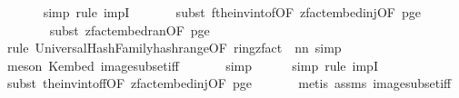 \begin{isabellebody}
\ \ \ \ \ \isamarkupfalse%
\ {\isacharparenleft}{\kern0pt}simp{\isacharcomma}{\kern0pt}\ rule\ impI{\isacharparenright}{\kern0pt}\isanewline
\ \ \ \ \ \isamarkupfalse%
\ {\isacharparenleft}{\kern0pt}subst\ f{\isacharunderscore}{\kern0pt}the{\isacharunderscore}{\kern0pt}inv{\isacharunderscore}{\kern0pt}into{\isacharunderscore}{\kern0pt}f{\isacharbrackleft}{\kern0pt}OF\ zfact{\isacharunderscore}{\kern0pt}embed{\isacharunderscore}{\kern0pt}inj{\isacharbrackleft}{\kern0pt}OF\ p{\isacharunderscore}{\kern0pt}ge{\isacharunderscore}{\kern0pt}{}{\isacharbrackright}{\kern0pt}{\isacharbrackright}{\kern0pt}{\isacharparenright}{\kern0pt}\isanewline
\ \ \ \ \ \ \isamarkupfalse%
\ {\isacharparenleft}{\kern0pt}subst\ zfact{\isacharunderscore}{\kern0pt}embed{\isacharunderscore}{\kern0pt}ran{\isacharbrackleft}{\kern0pt}OF\ p{\isacharunderscore}{\kern0pt}ge{\isacharunderscore}{\kern0pt}{}{\isacharbrackright}{\kern0pt}{\isacharparenright}{\kern0pt}\isanewline
\ \ \ \ \ \ \isamarkupfalse%
\ {\isacharparenleft}{\kern0pt}rule\ UniversalHashFamily{\isachardot}{\kern0pt}hash{\isacharunderscore}{\kern0pt}range{\isacharbrackleft}{\kern0pt}OF\ ring{\isacharunderscore}{\kern0pt}zfact{\isacharcomma}{\kern0pt}\ \ n{\isacharequal}{\kern0pt}{\isachardoublequoteopen}n{\isachardoublequoteclose}{\isacharbrackright}{\kern0pt}{\isacharcomma}{\kern0pt}\ simp{\isacharparenright}{\kern0pt}\isanewline
\ \ \ \ \ \ \isamarkupfalse%
\ {\isacharparenleft}{\kern0pt}meson\ K{\isacharunderscore}{\kern0pt}embed\ image{\isacharunderscore}{\kern0pt}subset{\isacharunderscore}{\kern0pt}iff{\isacharparenright}{\kern0pt}\isanewline
\ \ \ \ \ \isamarkupfalse%
\ simp\isanewline
\ \ \ \ \isamarkupfalse%
\ {\isacharparenleft}{\kern0pt}simp{\isacharcomma}{\kern0pt}\ rule\ impI{\isacharparenright}{\kern0pt}\isanewline
\ \ \ \ \isamarkupfalse%
\ {\isacharparenleft}{\kern0pt}subst\ the{\isacharunderscore}{\kern0pt}inv{\isacharunderscore}{\kern0pt}into{\isacharunderscore}{\kern0pt}f{\isacharunderscore}{\kern0pt}f{\isacharbrackleft}{\kern0pt}OF\ zfact{\isacharunderscore}{\kern0pt}embed{\isacharunderscore}{\kern0pt}inj{\isacharbrackleft}{\kern0pt}OF\ p{\isacharunderscore}{\kern0pt}ge{\isacharunderscore}{\kern0pt}{}{\isacharbrackright}{\kern0pt}{\isacharbrackright}{\kern0pt}{\isacharparenright}{\kern0pt}\isanewline
\ \ \ \ \ \isamarkupfalse%
\ {\isacharparenleft}{\kern0pt}metis\ assms{\isacharparenleft}{\kern0pt}{}{\isacharparenright}{\kern0pt}\ image{\isacharunderscore}{\kern0pt}subset{\isacharunderscore}{\kern0pt}iff{\isacharparenright}{\kern0pt}\ \isanewline

\end{isabellebody}
